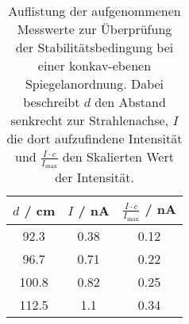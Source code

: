 \begin{table}
\centering
\caption{Auflistung der aufgenommenen Messwerte zur Überprüfung der
Stabilitätsbedingung bei einer konkav-ebenen Spiegelanordnung. Dabei beschreibt
$d$ den Abstand senkrecht zur Strahlenachse, $I$ die dort aufzufindene Intensität
und $\frac{I \cdot c}{I_\text{max}}$ den Skalierten Wert der Intensität.}
\begin{tabular}{ccc}
\toprule
$d$ / \si{\centi\meter} & $I$ / \si{\nano\ampere} & $\frac{I \cdot c}{I_\text{max}}$ / \si{\nano\ampere}\\
\midrule
92.3 & 0.38 & 0.12 \\
96.7 & 0.71 & 0.22 \\
100.8 & 0.82 & 0.25 \\
112.5 & 1.1 & 0.34 \\
\bottomrule
\end{tabular}
\label{tab:ke}
\end{table}
